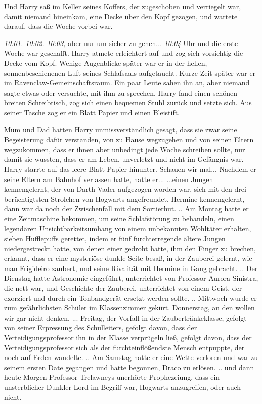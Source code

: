 Und Harry saß im Keller seines Koffers, der zugeschoben und verriegelt war,
damit niemand hineinkam, eine Decke über den Kopf gezogen, und wartete darauf,
dass die Woche vorbei war.

\emph{ 10:01. 10:02. 10:03,} aber nur um sicher zu gehen... \emph{10:04 }Uhr und
die erste Woche war geschafft. Harry atmete erleichtert auf und zog sich
vorsichtig die Decke vom Kopf. Wenige Augenblicke später war er in der hellen,
sonnenbeschienenen Luft seines Schlafsaals aufgetaucht. Kurze Zeit später war er
im Ravenclaw-Gemeinschaftsraum. Ein paar Leute sahen ihn an, aber niemand sagte
etwas oder versuchte, mit ihm zu sprechen. Harry fand einen schönen breiten
Schreibtisch, zog sich einen bequemen Stuhl zurück und setzte sich. Aus seiner
Tasche zog er ein Blatt Papier und einen Bleistift.

Mum und Dad hatten Harry unmissverständlich gesagt, dass sie zwar seine
Begeisterung dafür verstanden, von zu Hause wegzugehen und von seinen Eltern
wegzukommen, dass er ihnen aber unbedingt jede Woche schreiben sollte, nur damit
sie wussten, dass er am Leben, unverletzt und nicht im Gefängnis war. Harry
starrte auf das leere Blatt Papier hinunter. Schauen wir mal... Nachdem er seine
Eltern am Bahnhof verlassen hatte, hatte er... ...einen Jungen kennengelernt,
der von Darth Vader aufgezogen worden war, sich mit den drei berüchtigtsten
Strolchen von Hogwarts angefreundet, Hermine kennengelernt, dann war da noch der
Zwischenfall mit dem Sortierhut. .. Am Montag hatte er eine Zeitmaschine
bekommen, um seine Schlafstörung zu behandeln, einen legendären
Unsichtbarkeitsumhang von einem unbekannten Wohltäter erhalten, sieben
Hufflepuffs gerettet, indem er fünf furchterregende ältere Jungen
niedergestreckt hatte, von denen einer gedroht hatte, ihm den Finger zu brechen,
erkannt, dass er eine mysteriöse dunkle Seite besaß, in der Zauberei gelernt,
wie man Frigideiro zaubert, und seine Rivalität mit Hermine in Gang gebracht. ..
Der Dienstag hatte Astronomie eingeführt, unterrichtet von Professor Aurora
Sinistra, die nett war, und Geschichte der Zauberei, unterrichtet von einem
Geist, der exorziert und durch ein Tonbandgerät ersetzt werden sollte. ..
Mittwoch wurde er zum gefährlichsten Schüler im Klassenzimmer gekürt.
Donnerstag, an den wollen wir gar nicht denken. ... Freitag, der Vorfall in der
Zaubertränkeklasse, gefolgt von seiner Erpressung des Schulleiters, gefolgt
davon, dass der Verteidigungsprofessor ihn in der Klasse verprügeln ließ,
gefolgt davon, dass der Verteidigungsprofessor sich als der furchteinflößendste
Mensch entpuppte, der noch auf Erden wandelte. .. Am Samstag hatte er eine Wette
verloren und war zu seinem ersten Date gegangen und hatte begonnen, Draco zu
erlösen. .. und dann heute Morgen Professor Trelawneys unerhörte Prophezeiung,
dass ein unsterblicher Dunkler Lord im Begriff war, Hogwarts anzugreifen, oder
auch nicht.

